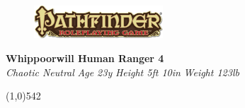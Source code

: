 \documentclass[letterpaper]{article}
\newcommand{\fullline}{\noindent\line(1,0){542} \\}
\begin{document}
\sffamily
\begin{figure}
\vspace{-1.5em}
\includegraphics[width=13em]{Pathfinder}
\end{figure}
\noindent \textbf{\huge{Whippoorwill }\Large{Human Ranger 4}} \\
\emph{Chaotic Neutral} \hspace{2em} \emph{Age 23y} \hspace{2em} \emph{Height 5ft 10in} \hspace{2em} \emph{Weight 123lb} \par
\vspace{-0.75em}

\fullline
\end{document}
